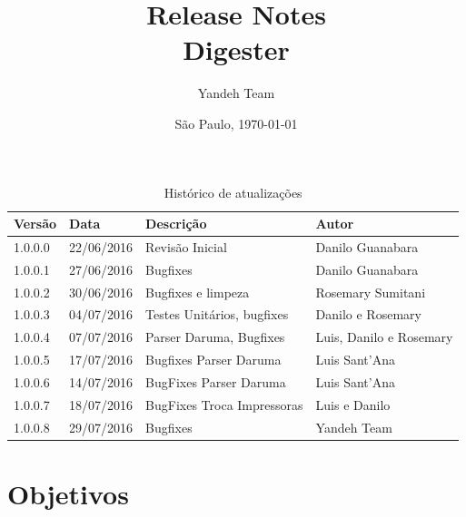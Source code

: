\documentclass{article}      %
\title{Release Notes \\
      Digester \versiondigester}  %
\author{Yandeh Team}              %
\date{São Paulo, \today}
\begin{document}

\maketitle                   %

\thispagestyle{firststyle}


\begin{table}[!ht]
\centering
\caption{Histórico de atualizações}
\label{my-label}
\begin{tabular}{|l|l|l|l|}
\hline
\textbf{Versão} & \textbf{Data} & \textbf{Descrição}                & \textbf{Autor}                                       \\ \hline
1.0.0.0           & 22/06/2016    & Revisão Inicial                 & Danilo Guanabara                                     \\ \hline
1.0.0.1           & 27/06/2016    & Bugfixes                        & Danilo Guanabara                                     \\ \hline
1.0.0.2           & 30/06/2016    & Bugfixes e limpeza              & Rosemary Sumitani                                    \\ \hline
1.0.0.3           & 04/07/2016    & Testes Unitários, bugfixes      & Danilo e Rosemary                                    \\ \hline
1.0.0.4           & 07/07/2016    & Parser Daruma, Bugfixes         & Luis, Danilo e Rosemary                              \\ \hline
1.0.0.5           & 17/07/2016    & Bugfixes Parser Daruma          & Luis Sant'Ana                                        \\ \hline
1.0.0.6           & 14/07/2016    & BugFixes Parser Daruma          & Luis Sant'Ana                                        \\ \hline  
1.0.0.7           & 18/07/2016    & BugFixes Troca Impressoras      & Luis e Danilo                                        \\ \hline
1.0.0.8           & 29/07/2016    & Bugfixes                        & Yandeh Team                                          \\ \hline
\end{tabular}
\end{table}



\section{Objetivos}
\end{document}
